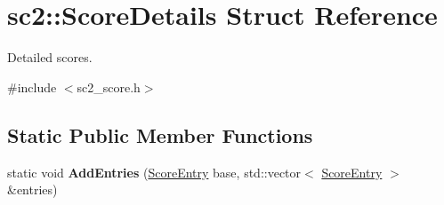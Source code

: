 \hypertarget{structsc2_1_1_score_details}{}\section{sc2\+:\+:Score\+Details Struct Reference}
\label{structsc2_1_1_score_details}


Detailed scores.  




{\ttfamily \#include $<$sc2\+\_\+score.\+h$>$}

\subsection*{Static Public Member Functions}
\begin{DoxyCompactItemize}
\item 
\mbox{\label{structsc2_1_1_score_details_ac0b693934fe7049b915c96149920a22b}} 
static void {\bfseries Add\+Entries} (\hyperlink{structsc2_1_1_score_entry}{Score\+Entry} base, std\+::vector$<$ \hyperlink{structsc2_1_1_score_entry}{Score\+Entry} $>$ \&entries)
\end{DoxyCompactItemize}
